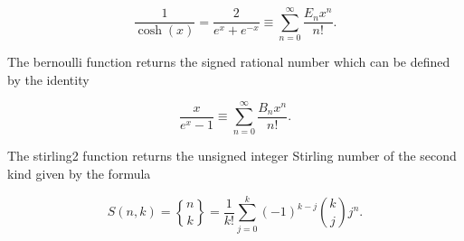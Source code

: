 \begin{equation}
\frac{1}{\cosh(x)} = \frac{2}{e^{x}+e^{-x}}
\equiv \sum_{n=0}^{\infty} \frac{E_{n}x^{n}}{n!}.
\end{equation}

 The {\courier bernoulli} function returns the signed rational
number which can be defined by the identity \cite{wolframfunctions:website}

\vspace{6.0pt}

\begin{equation}
\frac{x}{e^{x}-1}\equiv \sum_{n=0}^{\infty} \frac{B_{n}x^{n}}{n!}.
\end{equation}

 The {\courier stirling2} function returns the unsigned integer
Stirling number of the second kind given by the formula \cite{wiki:website}

\vspace{6.0pt}

\begin{equation}
S(n, k) = {\genfrac{\{}{\}}{0pt}{}{n}{k}} = \frac{1}{k!}
\sum_{j=0}^{k}(-1)^{k-j}\binom{k}{j} j^{n}.
\end{equation}

